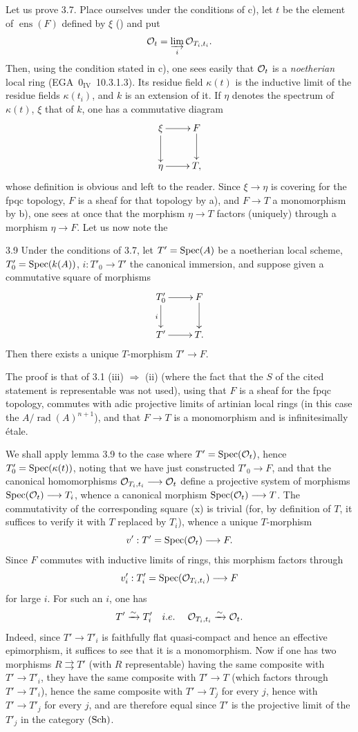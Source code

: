 Let us prove 3.7. Place ourselves under the conditions of c), let $t$ be the element of $\operatorname{ens}(F)$ defined by $\xi$ () and put
\[
\mathcal{O}_t=\varinjlim_i\mathcal{O}_{T_i,t_i}.
\]
Then, using the condition stated in c), one sees easily that $\mathcal{O}_t$ is a \emph{noetherian} local ring (EGA~$0_{\mathrm{IV}}$~10.3.1.3). Its residue field $\kappa(t)$ is the inductive limit of the residue fields $\kappa(t_i)$, and $k$ is an extension of it. If $\eta$ denotes the spectrum of $\kappa(t)$, $\xi$ that of $k$, one has a commutative diagram
\[
\xymatrix{\xi\ar[r]\ar[d]&F\ar[d]\\\eta\ar[r]&T,}
\]
whose definition is obvious and left to the reader. Since $\xi\to\eta$ is covering for the fpqc topology, $F$ is a sheaf for that topology by a), and $F\to T$ a monomorphism by b), one sees at once that the morphism $\eta\to T$ factors (uniquely) through a morphism $\eta\to F$. Let us now note the
\begin{lemma}{3.9}\label{XI.3.9}
Under the conditions of 3.7, let $T'=\operatorname{Spec}(A)$ be a noetherian local scheme, $T'_0=\operatorname{Spec}(k(A))$, $i:T'_0\to T'$ the canonical immersion, and suppose given a commutative square of morphisms
\[
\xymatrix{T'_0\ar[r]\ar[d]_i&F\ar[d]\\T'\ar[r]&T.}
\]
Then there exists a unique $T$-morphism $T'\to F$.
\end{lemma}
The proof is that of 3.1 (iii) $\Rightarrow$ (ii) (where the fact that the $S$ of the cited statement is representable was not used), using that $F$ is a sheaf for the fpqc topology, commutes with adic projective limits of artinian local rings (in this case the $A/\operatorname{rad}(A)^{n+1}$), and that $F\to T$ is a monomorphism and is infinitesimally étale.

We shall apply lemma 3.9 to the case where $T'=\operatorname{Spec}(\mathcal{O}_t)$, hence $T'_0=\operatorname{Spec}(\kappa(t))$, noting that we have just constructed $T'_0\to F$, and that the canonical homomorphisms $\mathcal{O}_{T_i,t_i}\longrightarrow\mathcal{O}_t$ define a projective system of morphisms $\operatorname{Spec}(\mathcal{O}_t)\longrightarrow T_i$, whence a canonical morphism $\operatorname{Spec}(\mathcal{O}_t)\longrightarrow T$. The commutativity of the corresponding square (x) is trivial (for, by definition of $T$, it suffices to verify it with $T$ replaced by $T_i$), whence a unique $T$-morphism
\[
v':T'=\operatorname{Spec}(\mathcal{O}_t)\longrightarrow F.
\]
Since $F$ commutes with inductive limits of rings, this morphism factors through
\[
v'_i:T'_i=\operatorname{Spec}(\mathcal{O}_{T_i,t_i})\longrightarrow F
\]
for large $i$. For such an $i$, one has
\[
T'\xrightarrow{\sim} T'_i\quad i.e.\kern.3em\quad\mathcal{O}_{T_i,t_i}\xrightarrow{\sim}\mathcal{O}_t.
\]
Indeed, since $T'\to T'_i$ is faithfully flat quasi-compact and hence an effective epimorphism, it suffices to see that it is a monomorphism. Now if one has two morphisms $R\rightrightarrows T'$ (with $R$ representable) having the same composite with $T'\to T'_i$, they have the same composite with $T'\to T$ (which factors through $T'\to T'_i$), hence the same composite with $T'\to T_j$ for every $j$, hence with $T'\to T'_j$ for every $j$, and are therefore equal since $T'$ is the projective limit of the $T'_j$ in the category $\textup{(Sch)}$.

